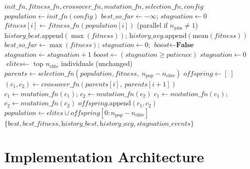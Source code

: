 \documentclass[12pt,a4paper]{article}
\begin{document}
\begin{algorithm}[H]
\caption{GeneticAlgorithm.run()}
\label{alg:ga}
\begin{algorithmic}[1]
\Require $\textit{init\_fn}, \textit{fitness\_fn}, \textit{crossover\_fn}, \textit{mutation\_fn}, \textit{selection\_fn}, \textit{config}$
\State $\textit{population} \leftarrow \textit{init\_fn}(\textit{config})$
\State $\textit{best\_so\_far} \leftarrow -\infty$; \; $\textit{stagnation} \leftarrow 0$
    \State $\textit{fitness}[i] \leftarrow \textit{fitness\_fn}(\textit{population}[i])$ \quad (parallel if $n_\text{jobs} \neq 1$)
    \State $\textit{history\_best}.\text{append}(\max(\textit{fitness}))$; \; $\textit{history\_avg}.\text{append}(\text{mean}(\textit{fitness}))$
        \State $\textit{best\_so\_far} \leftarrow \max(\textit{fitness})$; \; $\textit{stagnation} \leftarrow 0$; \; $\textit{boost} \leftarrow \textbf{False}$
    \Else
        \State $\textit{stagnation} \leftarrow \textit{stagnation} + 1$
        \State $\textit{boost} \leftarrow (\textit{stagnation} \geq \textit{patience})$
         \; $\textit{stagnation} \leftarrow 0$ \EndIf
    \EndIf
    \State $\textit{elites} \leftarrow$ top $n_\text{elite}$ individuals (unchanged)
    \State $\textit{parents} \leftarrow \textit{selection\_fn}(\textit{population}, \textit{fitness},\; n_\text{pop} - n_\text{elite})$
    \State $\textit{offspring} \leftarrow [\;]$
        \State $(c_1, c_2) \leftarrow \textit{crossover\_fn}(\textit{parents}[i],\; \textit{parents}[i{+}1])$
        \State $c_1 \leftarrow \textit{mutation\_fn}(c_1)$; \; $c_2 \leftarrow \textit{mutation\_fn}(c_2)$
         \; $c_1 \leftarrow \textit{mutation\_fn}(c_1)$; \; $c_2 \leftarrow \textit{mutation\_fn}(c_2)$ \EndIf
        \State $\textit{offspring}.\text{append}(c_1, c_2)$
    \EndFor
    \State $\textit{population} \leftarrow \textit{elites} \cup \textit{offspring}[0 : n_\text{pop} - n_\text{elite}]$
\EndFor
\State \Return $\{\textit{best}, \textit{best\_fitness}, \textit{history\_best}, \textit{history\_avg}, \textit{stagnation\_events}\}$
\end{algorithmic}
\end{algorithm}

\section{Implementation Architecture}
\label{sec:arch}
\end{document}
